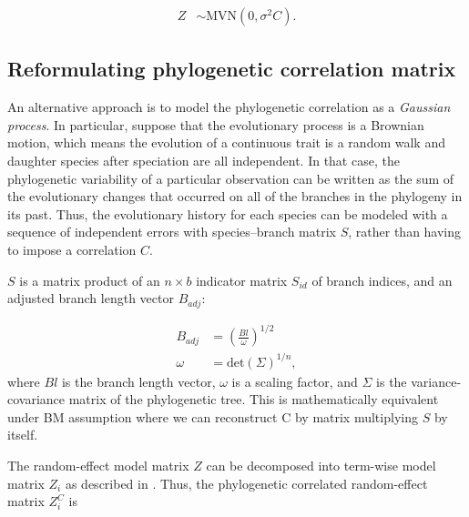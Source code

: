 \begin{align}
Z & \sim \textrm{MVN}(0,\sigma^{2}C). \label{eq:glmmgls}
\end{align}

\subsection{Reformulating phylogenetic correlation matrix}

An alternative approach is to model the phylogenetic correlation as a \textit{Gaussian process}. 
In particular, suppose that the evolutionary process is a Brownian motion, which means the evolution of a continuous trait is a random walk and daughter species after speciation are all independent.  
In that case, the phylogenetic variability of a particular observation can be written as the sum of the evolutionary changes that occurred on all of the branches in the phylogeny in its past. 
Thus, the evolutionary history for each species can be modeled with a sequence of independent errors with species--branch matrix $S$, rather than having to impose a correlation $C$. 

$S$ is a matrix product of an $n \times b$ indicator matrix $S_{id}$ of branch indices, and an adjusted branch length vector $B_{adj}$:

\begin{align}
B_{adj} & = (\frac{Bl}{\omega})^{1/2} \\
\omega & = \textrm{det}(\Sigma)^{1/n},
\end{align}
where $Bl$ is the branch length vector, $\omega$ is a scaling factor, and $\Sigma$ is the variance-covariance matrix of the phylogenetic tree.
This is mathematically equivalent under BM assumption where we can reconstruct C by matrix multiplying $S$ by itself.

The random-effect model matrix $Z$ can be decomposed into term-wise model matrix $Z_{i}$ as described in \citet{bates2015fitting}.
Thus, the phylogenetic correlated random-effect matrix $Z^{C}_{i}$ is

